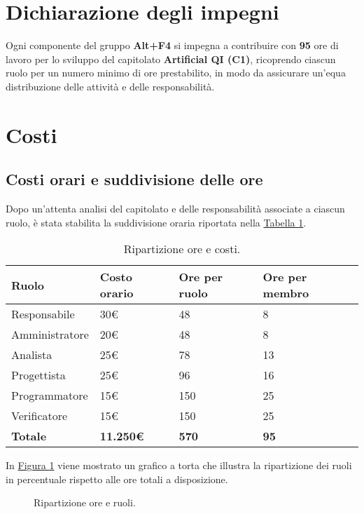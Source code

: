 \documentclass[a4paper, 12pt]{article}
\begin{document}
\newpage
\section{Dichiarazione degli impegni}
\label{sec:dichiarazione_impegni}
Ogni componente del gruppo \textbf{Alt+F4} si impegna a contribuire con \textbf{95} ore di lavoro per lo sviluppo del capitolato
\textbf{ Artificial QI (C1)}, ricoprendo ciascun ruolo per un numero minimo di ore prestabilito, in modo da assicurare un’equa distribuzione delle attività e delle responsabilità.

\section{Costi}
\label{sec:costi}
\subsection{Costi orari e suddivisione delle ore}
Dopo un’attenta analisi del capitolato e delle responsabilità associate a ciascun ruolo, è stata stabilita la suddivisione oraria riportata nella \hyperref[tab:ore]{Tabella \ref{tab:ore}}.

\begin{table}[!h]
    \centering
    \begin{tabularx}{\textwidth}{| X | X | X | X |}
        \hline
            \textbf{Ruolo} & 
            \textbf{Costo orario} & 
            \textbf{Ore per ruolo} & 
            \textbf{Ore per membro} \\ 
        \hline
        \hline
            Responsabile & 30€ & 48 & 8 \\
        \hline
            Amministratore & 20€ & 48 &  8 \\
        \hline 
            Analista & 25€ & 78 & 13 \\
        \hline 
            Progettista & 25€ & 96 & 16 \\
        \hline 
            Programmatore & 15€ & 150 & 25 \\
        \hline 
            Verificatore & 15€ & 150 & 25 \\
        \hline 
        \textbf{Totale} & \textbf{11.250€} & \textbf{570} & \textbf{95} \\ 
        \hline  
    \end{tabularx}
    \caption{Ripartizione ore e costi.}
    \label{tab:ore} 
\end{table}

In \hyperref[fig:pie]{Figura \ref{fig:pie}} viene mostrato un grafico a torta che illustra la ripartizione dei ruoli in percentuale rispetto alle ore totali a disposizione.
\begin{figure}[!h]
    \centering
    \caption{Ripartizione ore e ruoli.}
    \label{fig:pie}
\end{figure}
\end{document}
